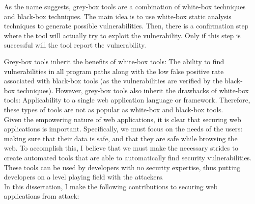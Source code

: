 As the name suggests, grey-box tools are a combination of white-box
techniques and black-box techniques. The main idea is to use white-box
static analysis techniques to generate possible vulnerabilities. Then,
there is a confirmation step where the tool will actually try to
exploit the vulnerability. Only if this step is successful will the
tool report the vulnerability.

Grey-box tools inherit the benefits of white-box tools: The ability to
find vulnerabilities in all program paths along with the low false
positive rate associated with black-box tools (as the vulnerabilities
are verified by the black-box techniques). However, grey-box tools also
inherit the drawbacks of white-box tools: Applicability to a single web
application language or framework. Therefore, these types of tools are
not as popular as white-box and black-box tools. 
\\

\noindent{}Given the empowering nature of web applications, it is
clear that securing web applications is important.
Specifically, we must focus on the needs of the users: making sure
that their data is safe, and that they are safe while browsing the
web. To accomplish this, I believe that we must make the necessary
strides to create automated tools that are able to automatically find
security vulnerabilities. These tools can be used by developers with
no security expertise, thus putting developers on a level playing
field with the attackers.
\\

\noindent{}In this dissertation, I make the following contributions to securing
web applications from attack:

